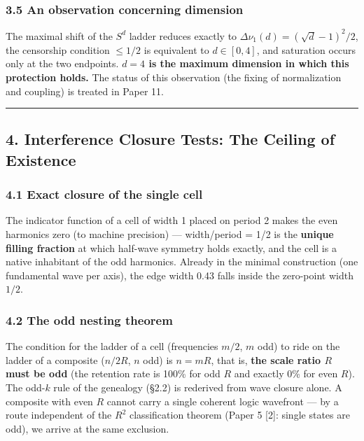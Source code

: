 \documentclass[
]{article}
\begin{document}
\subsubsection{3.5 An observation concerning
dimension}\label{an-observation-concerning-dimension}

The maximal shift of the \(S^d\) ladder reduces exactly to
\(\Delta\nu_1(d)=(\sqrt d-1)^2/2\), the censorship condition \(\le1/2\)
is equivalent to \(d\in[0,4]\), and saturation occurs only at the two
endpoints. \textbf{\(d=4\) is the maximum dimension in which this
protection holds.} The status of this observation (the fixing of
normalization and coupling) is treated in Paper 11.

\begin{center}\rule{0.5\linewidth}{0.5pt}\end{center}

\subsection{4. Interference Closure Tests: The Ceiling of
Existence}\label{interference-closure-tests-the-ceiling-of-existence}

\subsubsection{4.1 Exact closure of the single
cell}\label{exact-closure-of-the-single-cell}

The indicator function of a cell of width 1 placed on period 2 makes the
even harmonics zero (to machine precision) --- width/period = 1/2 is the
\textbf{unique filling fraction} at which half-wave symmetry holds
exactly, and the cell is a native inhabitant of the odd harmonics.
Already in the minimal construction (one fundamental wave per axis), the
edge width 0.43 falls inside the zero-point width \(1/2\).

\subsubsection{4.2 The odd nesting
theorem}\label{the-odd-nesting-theorem}

The condition for the ladder of a cell (frequencies \(m/2\), \(m\) odd)
to ride on the ladder of a composite (\(n/2R\), \(n\) odd) is \(n=mR\),
that is, \textbf{the scale ratio \(R\) must be odd} (the retention rate
is 100\% for odd \(R\) and exactly 0\% for even \(R\)). The odd-\(k\)
rule of the genealogy (§2.2) is rederived from wave closure alone. A
composite with even \(R\) cannot carry a single coherent logic wavefront
--- by a route independent of the \(R^2\) classification theorem (Paper
5 {[}2{]}: single states are odd), we arrive at the same exclusion.
\end{document}
